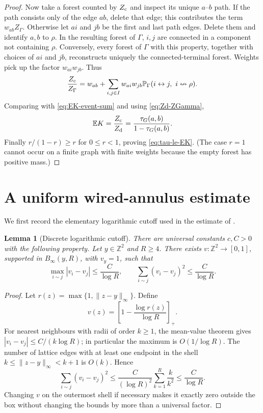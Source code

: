 \documentclass[11pt]{article}
\newtheorem{lemma}[theorem]{Lemma}
\theoremstyle{definition}
\theoremstyle{remark}
\newcommand{\PP}{\mathbb P}
\newcommand{\EE}{\mathbb E}
\newcommand{\ZZ}{\mathbb Z}
\newcommand{\1}{\mathbf 1}
\begin{document}
\begin{proof}
Now take a forest counted by $Z_{\rm c}$ and inspect its unique $a$--$b$ path.  If the
path consists only of the edge $ab$, delete that edge; this contributes the term
$w_{ab}Z_\Gamma$.  Otherwise let $ai$ and $jb$ be the first and last path edges.
Delete them and identify $a,b$ to $\rho$.  In the resulting forest of $\Gamma$,
$i,j$ are connected in a component not containing $\rho$.  Conversely, every forest
of $\Gamma$ with this property, together with choices of $ai$ and $jb$, reconstructs
uniquely the connected-terminal forest.  Weights pick up the factor $w_{ai}w_{jb}$.
Thus
\begin{equation}
 \frac{Z_{\rm c}}{Z_\Gamma}
 =w_{ab}+\sum_{i,j\in I}w_{ai}w_{jb}
 \PP_\Gamma(i\leftrightarrow j,\ i\nleftrightarrow\rho).
\end{equation}
Comparing with \eqref{eq:EK-event-sum} and using \eqref{eq:Zd-ZGamma},
\begin{equation}
 \EE K=\frac{Z_{\rm c}}{Z_{\rm d}}
 =\frac{\tau_G(a,b)}{1-\tau_G(a,b)}.
\end{equation}
Finally $r/(1-r)\ge r$ for $0\le r<1$, proving \eqref{eq:tau-le-EK}.  (The case
$r=1$ cannot occur on a finite graph with finite weights because the empty forest has
positive mass.)
\end{proof}

\section{A uniform wired-annulus estimate}\label{sec:annulus}

We first record the elementary logarithmic cutoff used in the estimate of \cite{BCHS}.

\begin{lemma}[Discrete logarithmic cutoff]\label{lem:log-cutoff}
There are universal constants $c,C>0$ with the following property.  Let $y\in\ZZ^2$
and $R\ge4$.  There exists $v:\ZZ^2\to[0,1]$, supported in
$B_\infty(y,R)$, with $v_y=1$, such that
\begin{equation}\label{eq:cutoff-gradient}
 \max_{i\sim j}|v_i-v_j|\le\frac{C}{\log R},
 \qquad
 \sum_{i\sim j}(v_i-v_j)^2\le\frac{C}{\log R}.
\end{equation}
\end{lemma}

\begin{proof}
Let $r(z)=\max\{1,\|z-y\|_\infty\}$.  Define
\begin{equation}
 v(z)=\left[1-\frac{\log r(z)}{\log R}\right]_+.
\end{equation}
For nearest neighbours with radii of order $k\ge1$, the mean-value theorem gives
$|v_i-v_j|\le C/(k\log R)$; in particular the maximum is $O(1/\log R)$.  The number
of lattice edges with at least one endpoint in the shell
$k\le\|z-y\|_\infty<k+1$ is $O(k)$.  Hence
\begin{equation}
 \sum_{i\sim j}(v_i-v_j)^2
 \le \frac{C}{(\log R)^2}\sum_{k=1}^{R}\frac{k}{k^2}
 \le\frac{C}{\log R}.
\end{equation}
Changing $v$ on the outermost shell if necessary makes it exactly zero outside the
box without changing the bounds by more than a universal factor.
\end{proof}
\end{document}
